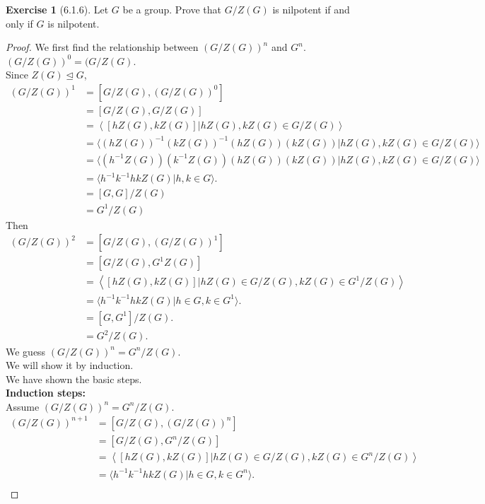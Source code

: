 \documentclass{amsart}
\theoremstyle{plain}
\theoremstyle{definition}
\newtheorem{exer}[lem]{Exercise}
\begin{document}
\begin{exer}[6.1.6]
Let $G$ be a group. 
Prove that $G/Z(G)$ is nilpotent if and only if $G$ is nilpotent.
\end{exer}
\begin{proof}
  We first find the relationship between $({G/Z(G)})^n$ and $G^n$.\\
    $(G/Z(G))^0 = (G/Z(G)$.\\
	 Since $Z(G) \unlhd G$,
	\begin{align*}
  	  ({G/Z(G)})^1 &= [G/Z(G),(G/Z(G))^0] \\ 
  	  			 &= [G/Z(G),G/Z(G)] \\
  	  		 	 &= \left\langle [hZ(G), kZ(G)]|hZ(G),kZ(G) \in G/Z(G)\right\rangle \\
  	  			 &= \langle (hZ(G))^{-1}(kZ(G))^{-1}(hZ(G))(kZ(G)) | hZ(G),kZ(G) \in G/Z(G) \rangle\\
  	  			 &=\langle (h^{-1}Z(G))(k^{-1}Z(G))(hZ(G))(kZ(G)) |  hZ(G),kZ(G) \in G/Z(G) \rangle \\
  	  			 &=\langle h^{-1}k^{-1}hkZ(G) | h,k \in G \rangle.\\
  	  			 &=[G,G]/Z(G)\\
  	  			 &=G^1 / Z(G) 
	\end{align*}
	Then 
	\begin{align*}
	({G/Z(G)})^2 &=[G/Z(G),({G/Z(G)})^1] \\
	  			 &=[G/Z(G), G^1 Z(G)]\\
				 &= \left\langle [hZ(G), kZ(G)]|hZ(G) \in G/Z(G), kZ(G) \in G^1/ Z(G)\right\rangle \\
  	  			 &=\langle h^{-1}k^{-1}hkZ(G) | h \in G, k \in G^1 \rangle.\\
  	  			 &=[G,G^1]/Z(G).\\
  	  			 &=G^2/Z(G).
	\end{align*}
	We guess $({G/Z(G)})^n = G^n/Z(G)$.\\
	We will show it by induction.\\
	We have shown the basic steps.\\
	\textbf{Induction steps: }\\
	Assume $({G/Z(G)})^n = G^n/Z(G)$.
	\begin{align*}
	  ({G/Z(G)})^{n+1} &=[G/Z(G),({G/Z(G)})^n] \\
	  			 &=[G/Z(G), G^n/Z(G)]\\
				 &= \left\langle [hZ(G), kZ(G)]|hZ(G) \in G/Z(G), kZ(G) \in G^n /Z(G)\right\rangle \\
  	  			 &=\langle h^{-1}k^{-1}hkZ(G) | h \in G, k \in G^n \rangle.\\

\end{align*}
\end{proof}
\end{document}
